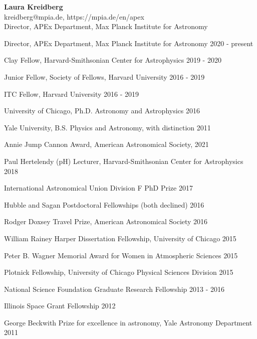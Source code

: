 \documentclass[12pt,letterpaper]{article}
\begin{document}
\thispagestyle{empty}\sloppy\sloppypar\raggedbottom

\textbf{\Large Laura Kreidberg}\\ 
\textsf{\small kreidberg@mpia.de, https://mpia.de/en/apex} \\[0.5ex]
Director, APEx Department, Max Planck Institute for Astronomy\\[0.5ex]

\begin{list}{}{\cvlist}

    \item Director, APEx Department, Max Planck Institute for Astronomy \hfill 2020 - present \\
    \item Clay Fellow, Harvard-Smithsonian Center for Astrophysics \hfill 2019 - 2020\\
    \item Junior Fellow, Society of Fellows, Harvard University \hfill 2016 - 2019\\
    \item ITC Fellow, Harvard University \hfill 2016 - 2019\\

\end{list}


\begin{list}{}{\cvlist}
    \item University of Chicago, Ph.D. Astronomy and Astrophysics \hfill 2016
    \item Yale University, B.S. Physics and Astronomy, with distinction \hfill 2011
\end{list}

\begin{list}{}{\cvlist}
    \item Annie Jump Cannon Award, American Astronomical Society, \hfill 2021
    \item Paul Hertelendy (pH) Lecturer, Harvard-Smithsonian Center for Astrophysics \hfill 2018 
    \item International Astronomical Union Division F PhD Prize \hfill 2017
    \item Hubble and Sagan Postdoctoral Fellowships (both declined) \hfill 2016
    \item Rodger Doxsey Travel Prize, American Astronomical Society \hfill 2016
    \item William Rainey Harper Dissertation Fellowship, University of Chicago \hfill 2015
    \item Peter B. Wagner Memorial Award for Women in Atmospheric Sciences \hfill 2015
    \item Plotnick Fellowship, University of Chicago Physical Sciences Division \hfill 2015
    \item National Science Foundation Graduate Research Fellowship \hfill 2013 - 2016
    \item Illinois Space Grant Fellowship \hfill 2012
    \item George Beckwith Prize for excellence in astronomy, Yale Astronomy Department \hfill2011
\end{list}
\end{document}
